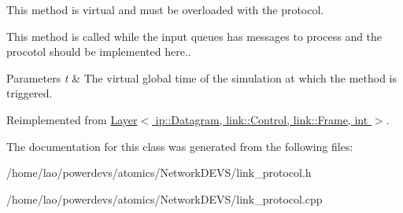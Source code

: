 This method is virtual and must be overloaded with the protocol. 

This method is called while the input queues has messages to process and the procotol should be implemented here..


\begin{DoxyParams}{Parameters}
{\em t} & The virtual global time of the simulation at which the method is triggered. \\
\hline
\end{DoxyParams}


Reimplemented from \hyperlink{classLayer_a1c82b14ba3efc37969f55c633a9b3173}{Layer$<$ ip\+::\+Datagram, link\+::\+Control, link\+::\+Frame, int $>$}.



The documentation for this class was generated from the following files\+:\begin{DoxyCompactItemize}
\item 
/home/lao/powerdevs/atomics/\+Network\+D\+E\+V\+S/link\+\_\+protocol.\+h\item 
/home/lao/powerdevs/atomics/\+Network\+D\+E\+V\+S/link\+\_\+protocol.\+cpp\end{DoxyCompactItemize}

